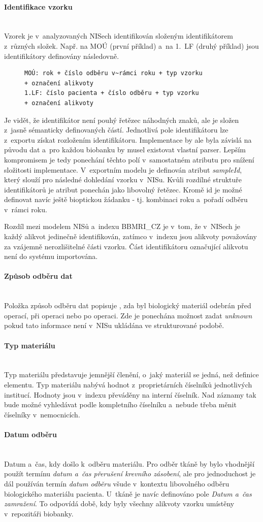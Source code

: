 \documentclass[11pt, draft, oneside]{fithesis2}
\newcommand{\paragraphNewLine}[1]{\paragraph*{#1}\mbox{}\\}
\newcommand{\ProjectName}{\mbox{BBMRI\_CZ}\xspace}
\begin{document}
\paragraphNewLine{Identifikace vzorku}
Vzorek je v~analyzovaných NISech identifikován složeným identifikátorem z~různých složek. 
Např. na MOÚ (první příklad) a~na 1.~LF (druhý příklad) jsou identifikátory definovány následovně. 
\begin{figure}[h!]
\centering
\begin{BVerbatim}
MOÚ: rok + číslo odběru v~rámci roku + typ vzorku 
+ označení alikvoty
1.LF: číslo pacienta + číslo odběru + typ vzorku 
+ označení alikvoty
\end{BVerbatim}
\end{figure}

Je vidět, že identifikátor není pouhý řetězec náhodných znaků, ale je složen z~jasně sémanticky definovaných částí. Jednotlivá pole identifikátoru lze z~exportu získat rozložením identifikátoru. Implementace by ale byla závislá na původu dat a~pro každou biobanku by musel existovat vlastní parser. Lepším kompromisem je tedy ponechání těchto polí v~samostatném atributu pro snížení složitosti implementace. V~exportním modelu je definován atribut \textit{sampleId}, který slouží pro následné dohledání vzorku v~NISu. Kvůli rozdílné struktuře identifikátorů je atribut ponechán jako libovolný řetězec. Kromě id je možné definovat navíc ještě bioptickou žádanku - tj. kombinaci roku a~pořadí odběru v~rámci roku.

Rozdíl mezi modelem NISů a~indexu \ProjectName je v~tom, že v~NISech je každý alikvot jedinečně identifikován, zatímco v~indexu jsou alikvoty považovány za vzájemně nerozlišitelné části vzorku. Část identifikátoru označující alikvotu není do systému importována.	
					
 \paragraphNewLine{Způsob odběru dat}					
	Položka způsob odběru dat popisuje , zda byl biologický materiál odebrán před operací, při operaci nebo po operaci. Zde je ponechána možnost zadat \textit{unknown} pokud tato informace není v~NISu ukládána ve strukturované podobě.
		
\paragraphNewLine{Typ materiálu}
Typ materiálu představuje jemnější členění, o~jaký materiál se jedná, než definice elementu. Typ materiálu nabývá hodnot z~proprietárních číselníků jednotlivých institucí. Hodnoty jsou v~indexu převáděny na interní číselník. Nad záznamy tak bude možné vyhledávat podle kompletního číselníku a~nebude třeba měnit číselníky v~nemocnicích. 
		
\paragraphNewLine{Datum odběru}
Datum a~čas, kdy došlo k~odběru materiálu. Pro odběr tkáně by bylo vhodnější použít termínu \textit{datum a~čas přerušení krevního zásobení}, ale pro jednoduchost je dál používán termín \textit{datum odběru} všude v~kontextu libovolného odběru biologického materiálu pacienta.
U~tkáně je navíc definováno pole \textit{Datum a~čas zamražení}. To odpovídá době, kdy byly všechny alikvoty vzorku umístěny v~repozitáři biobanky.
\end{document}
